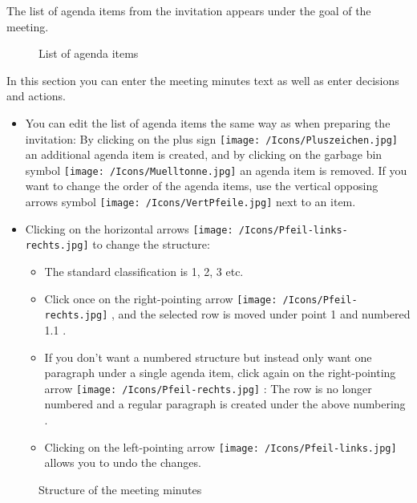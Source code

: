 The list of agenda items from the invitation appears under the goal of the meeting.

\begin{figure}[H]
\caption{List of agenda items}
\end{figure}

In this section you can enter the meeting minutes text as well as enter decisions and actions.

\begin{itemize}
\item
You can edit the list of agenda items the same way as when preparing the invitation: By clicking on the plus sign \texttt{[image: /Icons/Pluszeichen.jpg]}  an additional agenda item is created, and by clicking on the garbage bin symbol \texttt{[image: /Icons/Muelltonne.jpg]}  an agenda item is removed. If you want to change the order of the agenda items, use the vertical opposing arrows symbol \texttt{[image: /Icons/VertPfeile.jpg]}  next to an item.
\item
Clicking on the horizontal arrows \texttt{[image: /Icons/Pfeil-links-rechts.jpg]}  to change the structure:

	\begin{itemize}
		\item
		The standard classification is 1, 2, 3 etc. 
		\item
		Click once on the right-pointing arrow \texttt{[image: /Icons/Pfeil-rechts.jpg]} , and the selected row is moved under point 1 and numbered 1.1 .
		\item
		If you don't want a numbered structure but instead only want one paragraph under a single agenda item, click again on the right-pointing arrow \texttt{[image: /Icons/Pfeil-rechts.jpg]} : The row is no longer numbered and a regular paragraph is created under the above numbering .
		\item
		Clicking on the left-pointing arrow \texttt{[image: /Icons/Pfeil-links.jpg]}  allows you to undo the changes.
	\end{itemize}
\end{itemize}

\begin{figure}[H]
\caption{Structure of the meeting minutes}
\end{figure}

